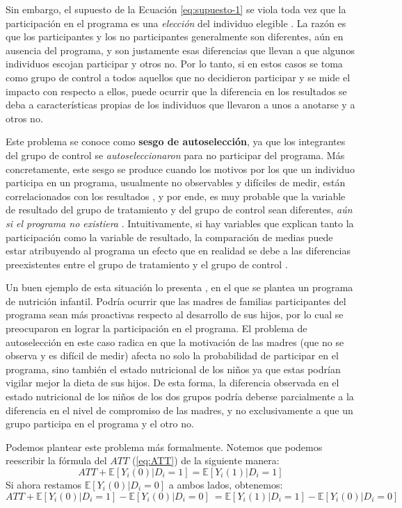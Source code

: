 \documentclass[../../main.tex]{subfiles}
\begin{document}
Sin embargo, el supuesto de la Ecuación \ref{eq:supuesto-1} se viola toda vez que la
participación en el programa es una \textit{elección} del individuo elegible
\cite{bernal}. La razón es que los participantes y los no participantes generalmente son
diferentes, aún en ausencia del programa, y son justamente esas diferencias que llevan a
que algunos individuos escojan participar y otros no. Por lo tanto, si en estos casos se
toma como grupo de control a todos aquellos que no decidieron participar y se mide el
impacto con respecto a ellos, puede ocurrir que la diferencia en los resultados se deba a
características propias de los individuos que llevaron a unos a anotarse y a otros no.

Este problema se conoce como \textbf{sesgo de autoselección}, ya que los integrantes del
grupo de control se \textit{autoseleccionaron} para no participar del programa. Más
concretamente, este sesgo se produce cuando los motivos por los que un individuo participa
en un programa, usualmente no observables y difíciles de medir, están correlacionados con
los resultados \cite{gertler-2016}, y por ende, es muy probable que la variable de
resultado del grupo de tratamiento y del grupo de control sean diferentes, \textit{aún si
el programa no existiera} \cite{bernal}. Intuitivamente, si hay variables que explican
tanto la participación como la variable de resultado, la comparación de medias puede estar
atribuyendo al programa un efecto que en realidad se debe a las diferencias preexistentes
entre el grupo de tratamiento y el grupo de control \cite{bernal}.

Un buen ejemplo de esta situación lo presenta \cite{bernal}, en el que se plantea un
programa de nutrición infantil. Podría ocurrir que las madres de familias participantes
del programa sean más proactivas respecto al desarrollo de sus hijos, por lo cual se
preocuparon en lograr la participación en el programa. El problema de autoselección en
este caso radica en que la motivación de las madres (que no se observa y es difícil de
medir) afecta no solo la probabilidad de participar en el programa, sino también el estado
nutricional de los niños ya que estas podrían vigilar mejor la dieta de sus hijos. De esta
forma, la diferencia observada en el estado nutricional de los niños de los dos grupos
podría deberse parcialmente a la diferencia en el nivel de compromiso de las madres, y no
exclusivamente a que un grupo participa en el programa y el otro no.

Podemos plantear este problema más formalmente. Notemos que podemos reescribir la fórmula
del \(ATT\) (\ref{eq:ATT}) de la siguiente manera:
\begin{equation}
    ATT + \mathbb{E} \left[Y_i(0)|D_i=1\right] = \mathbb{E} \left[Y_i(1)|D_i=1\right]
    \label{eq:ATT2}
\end{equation}
Si ahora restamos \(\mathbb{E} \left[Y_i(0)|D_i=0\right]\) a ambos lados, obtenemos:
\begin{equation}
    ATT + \mathbb{E} \left[Y_i(0)|D_i=1\right] - \mathbb{E} \left[Y_i(0)|D_i=0\right]\ =
    \mathbb{E} \left[Y_i(1)|D_i=1\right] - \mathbb{E} \left[Y_i(0)|D_i=0\right]\
    \label{eq:ATT3}
\end{equation}
\end{document}
